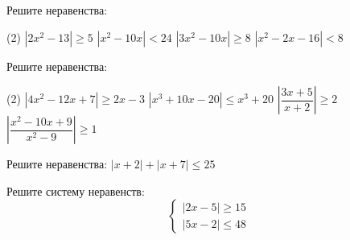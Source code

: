 \begin{class}[number=6]
	\begin{listofex}
		\item Решите неравенства: %
		\begin{tasks}(2)
			\task \( |2x^2-13| \ge 5 \)
			\task \( |x^2-10x|<24 \)
			\task \( |3x^2-10x| \ge 8 \)
			\task \( |x^2-2x-16|<8 \)
		\end{tasks}
		\item Решите неравенства: %
		\begin{tasks}(2)
			\task \( |4x^2-12x+7| \ge 2x-3 \)
			\task \( |x^3+10x-20| \le x^3+20 \)
			\task \( \left| \dfrac{ 3x+5 }{ x+2 } \right| \ge 2 \)
			\task \( \left| \dfrac{ x^2-10x+9 }{ x^2-9 } \right| \ge 1 \)
		\end{tasks}
		\item Решите неравенства: %
		\( |x+2|+|x+7| \le 25 \)
		\item Решите систему неравенств: %
		\[ \begin{cases} |2x-5| \ge 15 \\ |5x-2| \le 48 \end{cases} \]
	\end{listofex}
\end{class}

